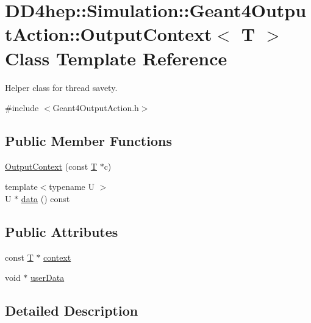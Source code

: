 \hypertarget{class_d_d4hep_1_1_simulation_1_1_geant4_output_action_1_1_output_context}{}\section{D\+D4hep\+:\+:Simulation\+:\+:Geant4\+Output\+Action\+:\+:Output\+Context$<$ T $>$ Class Template Reference}
\label{class_d_d4hep_1_1_simulation_1_1_geant4_output_action_1_1_output_context}


Helper class for thread savety.  




{\ttfamily \#include $<$Geant4\+Output\+Action.\+h$>$}

\subsection*{Public Member Functions}
\begin{DoxyCompactItemize}
\item 
\hyperlink{class_d_d4hep_1_1_simulation_1_1_geant4_output_action_1_1_output_context_a17ae6b51c22363bc840aaa02ea106c9f}{Output\+Context} (const \hyperlink{class_t}{T} $\ast$c)
\item 
{\footnotesize template$<$typename U $>$ }\\U $\ast$ \hyperlink{class_d_d4hep_1_1_simulation_1_1_geant4_output_action_1_1_output_context_a402a8c4a5cb1a9320dd0596bff3c7445}{data} () const
\end{DoxyCompactItemize}
\subsection*{Public Attributes}
\begin{DoxyCompactItemize}
\item 
const \hyperlink{class_t}{T} $\ast$ \hyperlink{class_d_d4hep_1_1_simulation_1_1_geant4_output_action_1_1_output_context_aba6a758066ac2a69e7300ac168bf89b5}{context}
\item 
void $\ast$ \hyperlink{class_d_d4hep_1_1_simulation_1_1_geant4_output_action_1_1_output_context_aac8a4f21a40d123eedfffecd9b6ea96a}{user\+Data}
\end{DoxyCompactItemize}


\subsection{Detailed Description}
